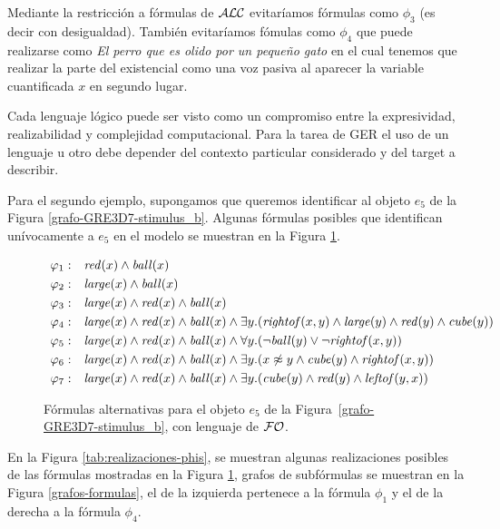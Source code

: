  Mediante la restricci\'on a f\'ormulas de $\mathcal{ALC}$ 
evitar\'iamos f\'ormulas como $\phi_3$ (es decir con desigualdad). Tambi\'en evitar\'iamos f\'omulas como $\phi_4$ que puede realizarse como {\it El perro que es olido por un peque\~no gato} en el cual tenemos que realizar la parte del existencial como una voz pasiva al aparecer la variable cuantificada $x$ en segundo lugar.

Cada lenguaje l\'ogico puede ser visto como un compromiso entre la expresividad, realizabilidad y complejidad computacional. Para la tarea de GER el uso de un lenguaje u otro debe depender del contexto particular considerado y del target a describir.

Para el segundo ejemplo, supongamos que queremos identificar al objeto $e_5$ de la Figura \ref{grafo-GRE3D7-stimulus_b}. Algunas f\'ormulas posibles
 que identifican un\'ivocamente a $e_5$ en el modelo se muestran en la Figura \ref{tab:phis}.

\begin{figure}[h]
$$
\begin{array}{ll}
 \varphi_1: & \mathit{red}(x) \land \mathit{ball}(x)\\[3pt]
 \varphi_2: & \mathit{large}(x) \land \mathit{ball}(x)\\[3pt]
 \varphi_3: & \mathit{large}(x) \land \mathit{red}(x) \land \mathit{ball}(x)\\[3pt]
 \varphi_4: & \mathit{large}(x) \land \mathit{red}(x) \land \mathit{ball}(x) \land
   \exists y . (\mathit{rightof}(x,y) \land \mathit{large}(y) \land \mathit{red}(y) \land \mathit{cube}(y))\\[3pt]
 \varphi_5: & \mathit{large}(x) \land \mathit{red}(x) \land \mathit{ball}(x) \land
  \forall y . (\neg \mathit{ball}(y) \lor \neg \mathit{rightof}(x,y))\\[3pt]
 \varphi_6: & \mathit{large}(x) \land \mathit{red}(x) \land \mathit{ball}(x) \land
  \exists y . (x \not\approx y \land \mathit{cube}(y) \land \mathit{rightof}(x,y))\\[3pt]
 \varphi_7: & \mathit{large}(x) \land \mathit{red}(x) \land \mathit{ball}(x) \land
  \exists y . (\mathit{cube}(y) \land \mathit{red}(y) \land \mathit{leftof}(y,x))
 \end{array}
$$
\caption{F\'ormulas alternativas para el objeto $e_5$ de la Figura~\protect\ref{grafo-GRE3D7-stimulus_b}, con lenguaje de $\mathcal{FO}$.}\label{tab:phis}
\end{figure}

En la Figura \ref{tab:realizaciones-phis}, se muestran algunas realizaciones posibles de las f\'ormulas mostradas en la Figura \ref{tab:phis}, grafos de subf\'ormulas se muestran en la Figura \ref{grafos-formulas}, el de la izquierda pertenece a la f\'ormula $\phi_1$ y el de la derecha a la f\'ormula $\phi_4$.

